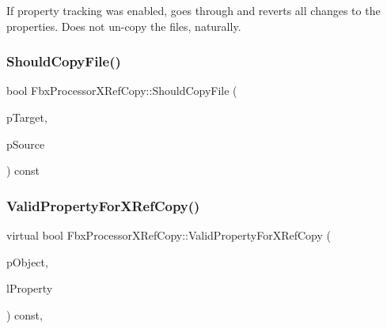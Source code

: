 If property tracking was enabled, goes through and reverts all changes to the properties. Does not un-\/copy the files, naturally. \mbox{\label{class_fbx_processor_x_ref_copy_a9457667850d550b1ccf1f848434f44c5}} 
\subsubsection{\texorpdfstring{Should\+Copy\+File()}{ShouldCopyFile()}}
{\footnotesize\ttfamily bool Fbx\+Processor\+X\+Ref\+Copy\+::\+Should\+Copy\+File (\begin{DoxyParamCaption}\item[{const \hyperlink{class_fbx_string}{Fbx\+String} \&}]{p\+Target,  }\item[{const \hyperlink{class_fbx_string}{Fbx\+String} \&}]{p\+Source }\end{DoxyParamCaption}) const\hspace{0.3cm}{\ttfamily [protected]}}

\mbox{\label{class_fbx_processor_x_ref_copy_a528c9b217f22eb04f68d3687774a18fd}} 
\subsubsection{\texorpdfstring{Valid\+Property\+For\+X\+Ref\+Copy()}{ValidPropertyForXRefCopy()}}
{\footnotesize\ttfamily virtual bool Fbx\+Processor\+X\+Ref\+Copy\+::\+Valid\+Property\+For\+X\+Ref\+Copy (\begin{DoxyParamCaption}\item[{\hyperlink{class_fbx_object}{Fbx\+Object} $\ast$}]{p\+Object,  }\item[{\hyperlink{class_fbx_property}{Fbx\+Property} \&}]{l\+Property }\end{DoxyParamCaption}) const\hspace{0.3cm}{\ttfamily [protected]}, {\ttfamily [virtual]}}



